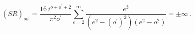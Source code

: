 \begin{equation}
(\bar{S}\bar{R})_{oo^{\prime }}={\frac{16\,i^{o+o^{\prime }+2}}{\pi
^{2}o^{\prime }}}\sum_{e=2}^{\infty }{\frac{e^{3}}{(e^2-(o^{\prime
})^{2})(e^2-o^{2})}}=\pm \infty \,.  \label{RR_divergence}
\end{equation}

